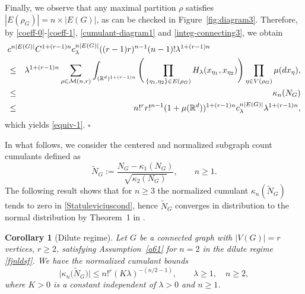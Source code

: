 \documentclass[12pt]{article}
\newcommand{\R}{\mathbb{R}}
\newtheorem{corollary}[prop]{Corollary}
\def\real{{\mathord{\mathbb R}}}
\newenvironment{Proof}{\removelastskip\par\medskip
\noindent{\em Proof.} \rm}{\penalty-20\null\hfill$\square$\par\medbreak}
\numberwithin{equation}{section}
\begin{document}
\begin{Proof}
\vspace{-0.5cm} 

\noindent
 Finally, we observe that any maximal partition $\rho$ satisfies
$|E(\rho_G)|=n\times|E(G)|$, 
as can be checked in Figure~\ref{fig:diagram3}.
 Therefore, by %
 \eqref{coeff-0}-\eqref{coeff-1},
 \eqref{cumulant-diagram1} and \eqref{integ-connecting3}, we obtain 
\begin{eqnarray*} 
  \lefteqn{
    c^{n|E(G)|}
    C^{1+(r-1)n}
    c_\lambda^{n|E(G)|}
    ( (r-1)r )^{n-1}(n-1)!
    \lambda^{1+(r-1)n}
  }
  \\
   & \leq &   
    \lambda^{1+(r-1)n}
  \sum_{\rho\in\mathcal{M}(n,r)}\int_{(\R^d)^{1+(r-1)n}}
  \Bigg(
  \prod_{\{\eta_1,\eta_2\}\in E(\rho_G)}H_\lambda(x_{\eta_1},x_{\eta_2})
  \Bigg)
  \prod_{\eta\in V(\rho_G)}\mu(dx_{\eta}),
  \\
   & \leq &     \kappa_n(N_G)
      \\
  & \leq & 
  n!^r r!^{n-1} 
  ( 1 + \mu ( \real^d))^{1+(r-1)n}
  c_\lambda^{n|E(G)|}
 \lambda^{1+(r-1)n}, 
\end{eqnarray*}
which yields \eqref{equiv-1}.
\end{Proof}
 In what follows, we consider the centered and normalized subgraph count cumulants defined as 
 $$
 \widetilde{N}_G
 := \frac{N_G - \kappa_1 (N_G)}{\sqrt{\kappa_2(N_G)}}, \qquad n \geq 1. 
$$
 The following result shows that for $n\geq 3$ the normalized cumulant
 $\kappa_n(\widetilde{N}_G)$ tends to zero in \eqref{Statuleviciuscond},
 hence $\widetilde{N}_G$ converges in distribution to the normal
 distribution by Theorem~1 in \cite{Janson1988}.   
\begin{corollary}[Dilute regime]
\label{t1-c}
Let $G$ be a connected graph with $|V(G)| = r$ vertices, $r\geq 2$, 
satisfying Assumption~\ref{a61} for $n=2$ in the dilute regime \eqref{fjnldsf}. 
  We have the normalized cumulant bounds 
 \begin{equation}
    \label{Statuleviciuscond}
  \big|\kappa_n \big(\widetilde{N}_G\big)\big|
  \leq n!^r ( K \lambda )^{-(n/2-1)},
  \qquad \lambda \geq 1, \quad n\geq 2,
\end{equation}
where $K>0$ is a constant independent of $\lambda >0$ and $n\geq 1$.
\end{corollary}
\end{document}
